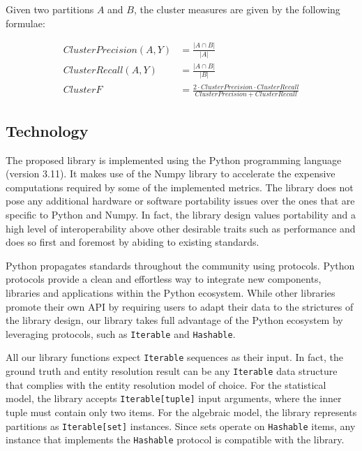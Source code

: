 \documentclass[a4paper,twoside]{article}
\begin{document}
    Given two partitions $A$ and $B$, the cluster measures are given by the
    following formulae:

    \begin{align*}
        Cluster Precision(A, Y) &= \frac{|{A}\cap{B}|}{|A|}\\
        Cluster Recall(A, Y) &= \frac{|{A}\cap{B}|}{|B|}\\
        Cluster F &= \frac{2\cdot{Cluster Precision}\cdot{Cluster Recall}}{Cluster Precision + Cluster Recall}
    \end{align*}

    \subsection{Technology}\label{sec:tech}

    The proposed library is implemented using the Python programming
    language (version 3.11)\cite{python}.
    It makes use of the Numpy library\cite{harris2020numpy} to accelerate
    the expensive computations required by some of the implemented metrics.
    The library does not pose any additional hardware or software portability
    issues over the ones that are specific to Python and Numpy.
    In fact, the library design values portability and a high level of
    interoperability above other desirable traits such as performance and does
    so first and foremost by abiding to existing standards.

    Python propagates standards throughout the community using protocols.
    Python protocols\cite{pyproto2017} provide a clean and effortless way to
    integrate new components, libraries and applications within the Python
    ecosystem.
    While other libraries\cite{nmeth2020scipy} promote their own API by
    requiring users to adapt their data to the strictures of the library design,
    our library takes full advantage of the Python ecosystem by leveraging
    protocols, such as \texttt{Iterable} and \texttt{Hashable}.

    All our library functions expect \texttt{Iterable} sequences as their input.
    In fact, the ground truth and entity resolution result can be any
    \texttt{Iterable} data structure that complies with the entity resolution
    model of choice.
    For the statistical model, the library accepts \texttt{Iterable[tuple]}
    input arguments, where the inner tuple must contain only two items.
    For the algebraic model, the library represents partitions as
    \texttt{Iterable[set]} instances.
    Since sets operate on \texttt{Hashable} items, any instance that implements
    the \texttt{Hashable} protocol is compatible with the library.
    
\end{document}
